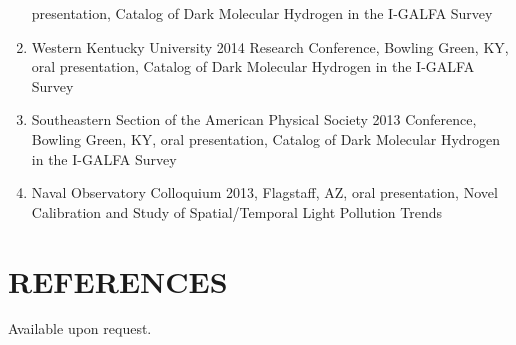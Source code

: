 \documentclass[line,margin]{res}
\begin{document}
\begin{resume}
\begin{enumerate}[leftmargin=*]
    presentation, Catalog of Dark Molecular Hydrogen in the I-GALFA Survey
    \item Western Kentucky University 2014 Research Conference, Bowling Green, KY, oral
    presentation, Catalog of Dark Molecular Hydrogen in the I-GALFA Survey
    \item Southeastern Section of the American Physical Society 2013 Conference, Bowling
    Green, KY, oral presentation, Catalog of Dark Molecular Hydrogen in the I-GALFA Survey
    \item Naval Observatory Colloquium 2013, Flagstaff, AZ, oral presentation, Novel Calibration
      and Study of Spatial/Temporal Light Pollution Trends
    \end{enumerate}
    
  \section{REFERENCES}
  Available upon request.
                
\end{resume}
\end{document}

